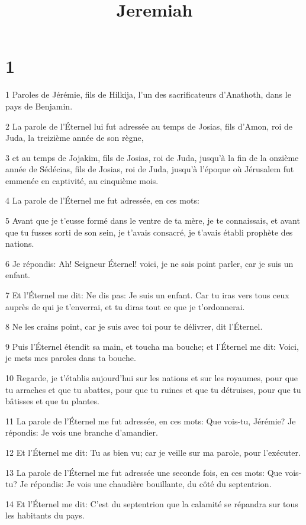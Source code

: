 

\title{Jeremiah}


\chapter{1}

\par 1 Paroles de Jérémie, fils de Hilkija, l'un des sacrificateurs d'Anathoth, dans le pays de Benjamin.
\par 2 La parole de l'Éternel lui fut adressée au temps de Josias, fils d'Amon, roi de Juda, la treizième année de son règne,
\par 3 et au temps de Jojakim, fils de Josias, roi de Juda, jusqu'à la fin de la onzième année de Sédécias, fils de Josias, roi de Juda, jusqu'à l'époque où Jérusalem fut emmenée en captivité, au cinquième mois.
\par 4 La parole de l'Éternel me fut adressée, en ces mots:
\par 5 Avant que je t'eusse formé dans le ventre de ta mère, je te connaissais, et avant que tu fusses sorti de son sein, je t'avais consacré, je t'avais établi prophète des nations.
\par 6 Je répondis: Ah! Seigneur Éternel! voici, je ne sais point parler, car je suis un enfant.
\par 7 Et l'Éternel me dit: Ne dis pas: Je suis un enfant. Car tu iras vers tous ceux auprès de qui je t'enverrai, et tu diras tout ce que je t'ordonnerai.
\par 8 Ne les crains point, car je suis avec toi pour te délivrer, dit l'Éternel.
\par 9 Puis l'Éternel étendit sa main, et toucha ma bouche; et l'Éternel me dit: Voici, je mets mes paroles dans ta bouche.
\par 10 Regarde, je t'établis aujourd'hui sur les nations et sur les royaumes, pour que tu arraches et que tu abattes, pour que tu ruines et que tu détruises, pour que tu bâtisses et que tu plantes.
\par 11 La parole de l'Éternel me fut adressée, en ces mots: Que vois-tu, Jérémie? Je répondis: Je vois une branche d'amandier.
\par 12 Et l'Éternel me dit: Tu as bien vu; car je veille sur ma parole, pour l'exécuter.
\par 13 La parole de l'Éternel me fut adressée une seconde fois, en ces mots: Que vois-tu? Je répondis: Je vois une chaudière bouillante, du côté du septentrion.
\par 14 Et l'Éternel me dit: C'est du septentrion que la calamité se répandra sur tous les habitants du pays.
